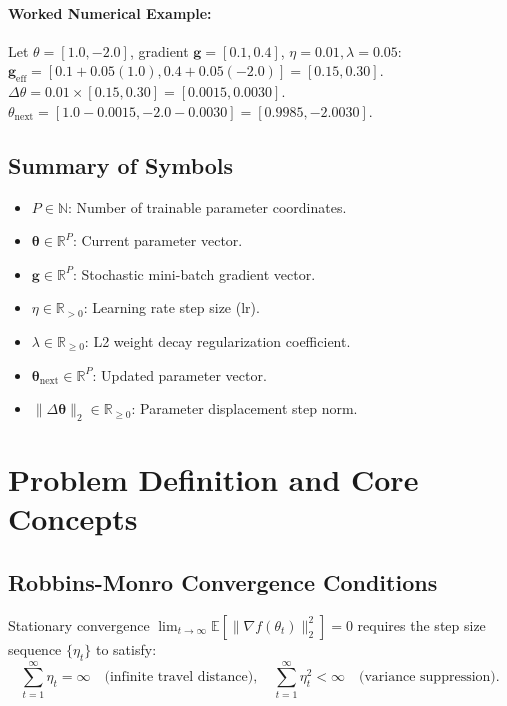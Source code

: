 \documentclass[11pt]{article}
\begin{document}
\paragraph{Worked Numerical Example:}
Let $\theta = [1.0, -2.0]$, gradient $\mathbf{g} = [0.1, 0.4]$, $\eta = 0.01, \lambda = 0.05$:
$\mathbf{g}_{\mathrm{eff}} = [0.1 + 0.05(1.0), 0.4 + 0.05(-2.0)] = [0.15, 0.30]$.
$\Delta\theta = 0.01 \times [0.15, 0.30] = [0.0015, 0.0030]$.
$\theta_{\mathrm{next}} = [1.0 - 0.0015, -2.0 - 0.0030] = [0.9985, -2.0030]$.

\subsection{Summary of Symbols}
\begin{itemize}
    \item $P \in \mathbb{N}$: Number of trainable parameter coordinates.
    \item $\boldsymbol{\theta} \in \mathbb{R}^P$: Current parameter vector.
    \item $\mathbf{g} \in \mathbb{R}^P$: Stochastic mini-batch gradient vector.
    \item $\eta \in \mathbb{R}_{>0}$: Learning rate step size ($\mathrm{lr}$).
    \item $\lambda \in \mathbb{R}_{\ge 0}$: L2 weight decay regularization coefficient.
    \item $\boldsymbol{\theta}_{\mathrm{next}} \in \mathbb{R}^P$: Updated parameter vector.
    \item $\|\Delta\boldsymbol{\theta}\|_2 \in \mathbb{R}_{\ge 0}$: Parameter displacement step norm.
\end{itemize}

\section{Problem Definition and Core Concepts}
\label{sec:problem_definition}

\subsection{Robbins-Monro Convergence Conditions}
Stationary convergence $\lim_{t \to \infty} \mathbb{E}[\|\nabla f(\theta_t)\|_2^2] = 0$ requires the step size sequence $\{\eta_t\}$ to satisfy:
\begin{equation}
\label{eq:robbins_monro}
\sum_{t=1}^\infty \eta_t = \infty \quad \text{(infinite travel distance)}, \quad \sum_{t=1}^\infty \eta_t^2 < \infty \quad \text{(variance suppression)}.
\end{equation}
\end{document}
